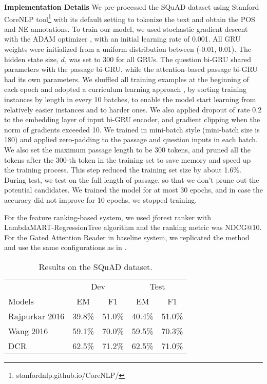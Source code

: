 \documentclass[letterpaper]{article}
\begin{document}
\noindent\textbf{Implementation Details}
We pre-processed the SQuAD dataset using Stanford CoreNLP tool\footnote{ stanfordnlp.github.io/CoreNLP/} \cite{manning-EtAl:2014:P14-5} with its default setting to tokenize the text and obtain the POS and NE annotations. To train our model, we used stochastic gradient descent with the ADAM optimizer \cite{kingma2014adam}, with an initial learning rate of 0.001. All GRU weights were initialized from a uniform distribution between (-0.01, 0.01). The hidden state size, $d$, was set to 300 for all GRUs. The question bi-GRU shared parameters with the passage bi-GRU, while the attention-based passage bi-GRU had its own parameters. We shuffled all training examples at the beginning of each epoch and adopted a curriculum learning approach \cite{bengio2009curriculum}, by sorting training instances by length in every 10 batches, to enable the model start learning from relatively easier instances and to harder ones.
We also applied dropout of rate 0.2 to the embedding layer of input bi-GRU encoder, and gradient clipping when the norm of gradients exceeded 10. We trained in mini-batch style (mini-batch size is 180) and applied zero-padding to the passage and question inputs in each batch. We also set the maximum passage length to be 300 tokens, and pruned all the tokens after the 300-th token in the training set to save memory and speed up the training process. This step reduced the training set size by about 1.6\%. During test, we test on the full length of passage, so that we don't prune out the potential candidates. We trained the model for at most 30 epochs, and in case the accuracy did not improve for 10 epochs, we stopped training. 

For the feature ranking-based system, we used jforest ranker \cite{Ganji:2011:SIGIR} with LambdaMART-RegressionTree algorithm and the ranking metric was NDCG@10. For the Gated Attention Reader in baseline system, we replicated the method and use the same configurations as in \cite{dhingra2016gated}.

\begin{table}
\caption{Results on the SQuAD dataset.}
\label{tbl_results}
\centering
\begin{tabular}{lcccc}
\hline
&\multicolumn{2}{c}{Dev}&\multicolumn{2}{c}{Test}\\
Models&EM&F1&EM&F1\\
\hline
Rajpurkar 2016&39.8\%&51.0\%&40.4\%&51.0\%\\
Wang 2016&59.1\%&70.0\%&59.5\%&70.3\%\\
DCR &62.5\%&71.2\%&62.5\%&71.0\%\\

\hline
\end{tabular}
\end{table}
\end{document}
